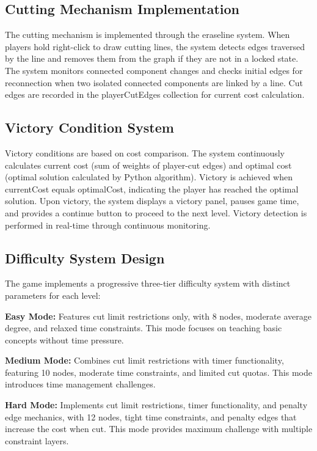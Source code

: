 \documentclass[english]{tudscrreprt}
\begin{document}
\subsection{Cutting Mechanism Implementation}
The cutting mechanism is implemented through the eraseline system. When players hold right-click to draw cutting lines, the system detects edges traversed by the line and removes them from the graph if they are not in a locked state. The system monitors connected component changes and checks initial edges for reconnection when two isolated connected components are linked by a line. Cut edges are recorded in the playerCutEdges collection for current cost calculation.

\subsection{Victory Condition System}
Victory conditions are based on cost comparison. The system continuously calculates current cost (sum of weights of player-cut edges) and optimal cost (optimal solution calculated by Python algorithm). Victory is achieved when currentCost equals optimalCost, indicating the player has reached the optimal solution. Upon victory, the system displays a victory panel, pauses game time, and provides a continue button to proceed to the next level. Victory detection is performed in real-time through continuous monitoring.

\subsection{Difficulty System Design}
The game implements a progressive three-tier difficulty system with distinct parameters for each level:

\textbf{Easy Mode:} Features cut limit restrictions only, with 8 nodes, moderate average degree, and relaxed time constraints. This mode focuses on teaching basic concepts without time pressure.

\textbf{Medium Mode:} Combines cut limit restrictions with timer functionality, featuring 10 nodes, moderate time constraints, and limited cut quotas. This mode introduces time management challenges.

\textbf{Hard Mode:} Implements cut limit restrictions, timer functionality, and penalty edge mechanics, with 12 nodes, tight time constraints, and penalty edges that increase the cost when cut. This mode provides maximum challenge with multiple constraint layers.
\end{document}
